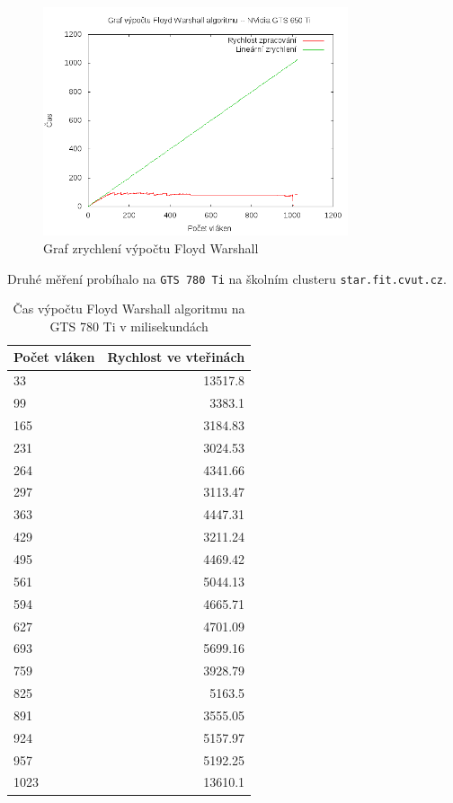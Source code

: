 \documentclass[a4paper,10pt]{article}
\begin{document}
\begin{figure}[H]
  \centering
    \includegraphics[width=0.8\textwidth]{graf_floyd_gts_650_Ti.png}
  \caption{Graf zrychlení výpočtu Floyd Warshall}
  \label{fig:floydcuda}
\end{figure}


Druhé měření probíhalo na \texttt{GTS 780 Ti} na školním clusteru \texttt{star.fit.cvut.cz}.

\begin{table}[H]
  \centering
	\caption{Čas výpočtu Floyd Warshall algoritmu na GTS 780 Ti v milisekundách}
	\begin{tabular}{| l | r |}
\hline
Počet vláken & Rychlost ve vteřinách \\ \hline
33 & 13517.8 \\ \hline
99 & 3383.1 \\ \hline
165 & 3184.83 \\ \hline
231 & 3024.53 \\ \hline
264 & 4341.66 \\ \hline
297 & 3113.47 \\ \hline
363 & 4447.31 \\ \hline
429 & 3211.24 \\ \hline
495 & 4469.42 \\ \hline
561 & 5044.13 \\ \hline
594 & 4665.71 \\ \hline
627 & 4701.09 \\ \hline
693 & 5699.16 \\ \hline
759 & 3928.79 \\ \hline
825 & 5163.5 \\ \hline
891 & 3555.05 \\ \hline
924 & 5157.97 \\ \hline
957 & 5192.25 \\ \hline
1023 & 13610.1 \\ \hline
	\end{tabular}
  \label{tab:cufltwo}
\end{table}
\end{document}

